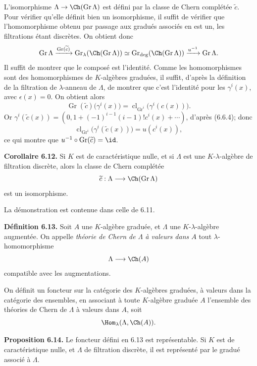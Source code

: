 \documentclass[11pt]{article}
\newcommand{\Gr}{\operatorname{Gr}}
\newcommand{\cl}{\operatorname{cl}}
\providecommand{\Gr}{\operatorname{Gr}}
\providecommand{\Gr}{\operatorname{G}}
\begin{document}
L'isomorphisme \(\Lambda\to\Ch(\Gr\Lambda)\) est défini par la classe de Chern complétée \(\widetilde c\). Pour vérifier qu'elle définit bien un isomorphisme, il suffit de vérifier que l'homomorphisme obtenu par passage aux gradués associés en est un, les filtrations étant discrètes. On obtient donc
\[
  \Gr\Lambda
   \xrightarrow{\Gr(\widetilde c)}
  \Gr_{\lambda}(\Ch(\Gr\Lambda))
   \simeq
  \Gr_{\deg}(\Ch(\Gr\Lambda))
   \xrightarrow{u^{-1}}
  \Gr\Lambda .
\]
Il suffit de montrer que le composé est l'identité. Comme les homomorphismes sont des homomorphismes de \(K\)-algèbres graduées, il suffit, d'après la définition de la filtration de \(\lambda\)-anneau de \(\Lambda\), de montrer que c'est l'identité pour les \(\gamma^i(x)\), avec \(\epsilon(x)=0\). On obtient alors
\[
  \Gr(\widetilde c)\bigl(\gamma^i(x)\bigr)
  =
  \cl_{\Gr^i}\bigl(\gamma^i(c(x))\bigr).
\]
Or \(\gamma^i(\widetilde c(x))=(0,1+(-1)^{i-1}(i-1)!c^i(x)+\cdots)\), d'après (6.6.4); donc
\[
  \cl_{\Gr^i}\bigl(\gamma^i(\widetilde c(x))\bigr)=u(c^i(x)),
\]
ce qui montre que \(u^{-1}\circ\Gr(\widetilde c)=\id\).

\textbf{Corollaire 6.12.} Si \(K\) est de caractéristique nulle, et si \(\Lambda\) est une \(K\)-\(\lambda\)-algèbre de filtration discrète, alors la classe de Chern complétée
\[
  \widetilde c:\Lambda\longrightarrow \Ch(\Gr\Lambda)
\]
est un isomorphisme.

La démonstration est contenue dans celle de 6.11.

\textbf{Définition 6.13.} Soit \(A\) une \(K\)-algèbre graduée, et \(\Lambda\) une \(K\)-\(\lambda\)-algèbre augmentée. On appelle \emph{théorie de Chern de \(\Lambda\) à valeurs dans \(A\)} tout \(\lambda\)-homomorphisme
\[
  \Lambda\longrightarrow \Ch(A)
\]
compatible avec les augmentations.

On définit un foncteur sur la catégorie des \(K\)-algèbres graduées, à valeurs dans la catégorie des ensembles, en associant à toute \(K\)-algèbre graduée \(A\) l'ensemble des théories de Chern de \(\Lambda\) à valeurs dans \(A\), soit
\[
  \Hom_\lambda(\Lambda,\Ch(A)).
\]

\textbf{Proposition 6.14.} Le foncteur défini en 6.13 est représentable. Si \(K\) est de caractéristique nulle, et \(\Lambda\) de filtration discrète, il est représenté par le gradué associé à \(\Lambda\).
\end{document}
